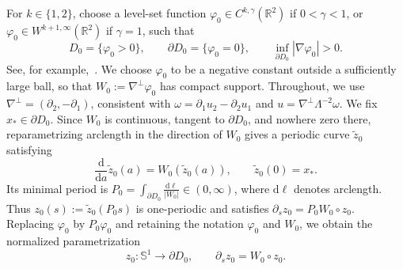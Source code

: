 \documentclass[reqno,11pt,a4paper]{amsart}
\newcommand{\dd}{\mathrm{d}}
\begin{document}
For $k\in\{1,2\}$, choose a level-set function
$\varphi_0\in C^{k,\gamma}(\mathbb R^2)$
if $0<\gamma<1$, or
$\varphi_0\in W^{k+1,\infty}(\mathbb R^2)$
if $\gamma=1$, such that
\[
  D_0=\{\varphi_0>0\},\qquad
  \partial D_0=\{\varphi_0=0\},\qquad
  \inf_{\partial D_0}|\nabla\varphi_0|>0.
\]
See, for example,~\cite[p.~919]{KRYZ16}.
We choose $\varphi_0$ to be a negative constant
outside a sufficiently large ball, so that
$W_0:=\nabla^\perp\varphi_0$ has compact support.
Throughout, we use $\nabla^\perp=(\partial_2,-\partial_1)$,
consistent with $\omega=\partial_1u_2-\partial_2u_1$ and
$u=\nabla^\perp\Lambda^{-2}\omega$.
We fix
$x_*\in\partial D_0$.
Since $W_0$ is continuous, tangent to $\partial D_0$,
and nowhere zero there, reparametrizing arclength
in the direction of $W_0$ gives a periodic curve
$\widetilde z_0$ satisfying
\[
  \frac{\dd}{\dd a}\widetilde z_0(a)
  =W_0(\widetilde z_0(a)),
  \qquad \widetilde z_0(0)=x_*.
\]
Its minimal period is
$P_0=\int_{\partial D_0}\frac{\dd\ell}{|W_0|}\in(0,\infty)$,
where $\dd\ell$ denotes arclength.
Thus $z_0(s):=\widetilde z_0(P_0s)$ is one-periodic
and satisfies $\partial_s z_0=P_0W_0\circ z_0$.
Replacing $\varphi_0$ by $P_0\varphi_0$
and retaining the notation $\varphi_0$ and $W_0$,
we obtain the normalized parametrization
\[
  z_0\colon\mathbb S^1\longrightarrow\partial D_0,
  \qquad \partial_s z_0=W_0\circ z_0.
\]
\end{document}
